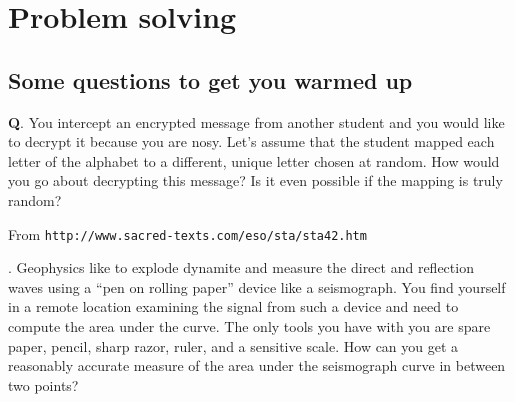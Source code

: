 \chapter{Problem solving}

\setcounter{problem}{1}

\section{Some questions to get you warmed up}


{\bf Q}. You intercept an encrypted message from another student and you would like to decrypt it because you are nosy. Let's assume that the student mapped each letter of the alphabet to a different, unique letter chosen at random. How would you go about decrypting this message? Is it even possible if the mapping is truly random?

\begin{marginfigure}[-1.2in]
\begin{center}
\end{center}
\caption{\tiny From {\tt http://www.sacred-texts.com/eso/sta/sta42.htm}}
\end{marginfigure}


\vspace{15mm}

. Geophysics like to explode dynamite and measure the direct and reflection waves using a ``pen on rolling paper'' device like a seismograph.  You find yourself in a remote location examining the signal from such a device and need to compute the area under the curve. The only tools you have with you are spare paper, pencil, sharp razor, ruler, and a sensitive scale. How can you get a reasonably accurate measure of the area under the seismograph curve in between two points?

